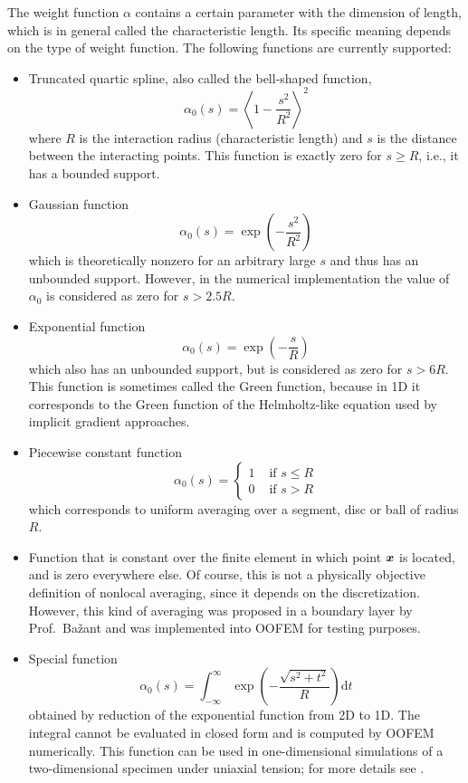 \documentclass[a4paper]{article}
\newcommand{\mbf}[1]{\mbox{\boldmath$#1$}}
\begin{document}
The weight function $\alpha$ contains a certain parameter with the dimension
of length, which is in general called the characteristic length. Its specific
meaning depends on the type of weight function. The following functions are
currently supported:
\begin{itemize}
\item
Truncated quartic spline, also called the bell-shaped function,
$$
\alpha_0(s) = \left\langle 1-\frac{s^2}{R^2}\right\rangle^2
$$
where $R$ is the interaction radius (characteristic length) and 
$s$ is the distance between the interacting points. This function 
is exactly zero for $s\ge R$, i.e., it has a bounded support.
\item
Gaussian function
$$
\alpha_0(s) = \exp\left(-\frac{s^2}{R^2}\right)
$$
which is theoretically nonzero for an arbitrary large $s$ and thus
has an unbounded support. However, in the numerical implementation
the value of $\alpha_0$ is considered as zero for $s>2.5R$.
\item
Exponential function
$$
\alpha_0(s) = \exp\left(-\frac{s}{R}\right)
$$
which also has an unbounded support, but is considered as zero for $s>6R$.
This function is sometimes called the Green function, because in 1D it
corresponds to the Green function of the Helmholtz-like equation used
by implicit gradient approaches.
\item
Piecewise constant function
$$
\alpha_0(s) =\left\{\begin{array}{cc} 1 & \mbox{ if } s\le R \\ 0 & \mbox{ if } s> R \end{array}\right.
$$
which corresponds to uniform averaging over a segment, disc or ball
of radius $R$. 
\item
Function that is constant over the finite element in which point $\mbf{x}$
is located, and is zero everywhere else. Of course, this is not a physically
objective definition of nonlocal averaging, since it depends on the
discretization. However, this kind of averaging was proposed in a boundary
layer by Prof.\ Ba\v{z}ant and was implemented into OOFEM for testing purposes.
\item
Special function 
$$
\alpha_0(s) =\int_{-\infty}^\infty \exp\left(-\frac{\sqrt{s^2+t^2}}{R}\right)\mbox{d}t
$$
obtained by reduction of the exponential function from 2D to 1D.
The integral cannot be evaluated in closed form and is computed by OOFEM numerically.
This function can be used in one-dimensional simulations of a two-dimensional specimen 
under uniaxial tension; for more details see \cite{Gra14}.
\end{itemize}  
 
\end{document}
